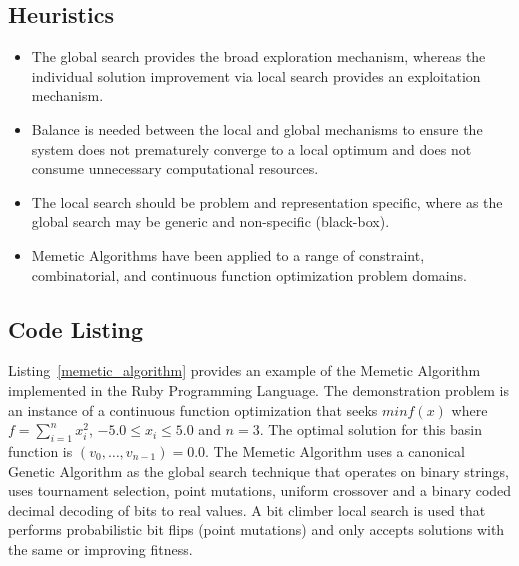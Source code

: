 \subsection{Heuristics}
\begin{itemize}
	\item The global search provides the broad exploration mechanism, whereas the individual solution improvement via local search provides an exploitation mechanism. 
	\item Balance is needed between the local and global mechanisms to ensure the system does not prematurely converge to a local optimum and does not consume unnecessary computational resources.
	\item The local search should be problem and representation specific, where as the global search may be generic and non-specific (black-box).
	\item Memetic Algorithms have been applied to a range of constraint, combinatorial, and continuous function optimization problem domains.
\end{itemize}

\subsection{Code Listing}
Listing~\ref{memetic_algorithm} provides an example of the Memetic Algorithm implemented in the Ruby Programming Language. 
The demonstration problem is an instance of a continuous function optimization that seeks $min f(x)$ where $f=\sum_{i=1}^n x_{i}^2$, $-5.0\leq x_i \leq 5.0$ and $n=3$. The optimal solution for this basin function is $(v_0,\ldots,v_{n-1})=0.0$.
The Memetic Algorithm uses a canonical Genetic Algorithm as the global search technique that operates on binary strings, uses tournament selection, point mutations, uniform crossover and a binary coded decimal decoding of bits to real values. A bit climber local search is used that performs probabilistic bit flips (point mutations) and only accepts solutions with the same or improving fitness. 

